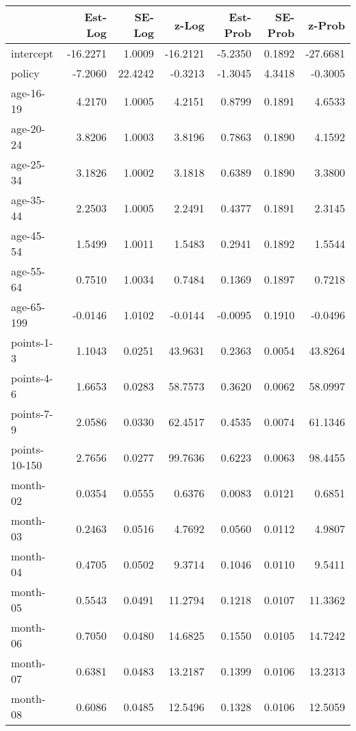 \documentclass[10pt]{article}
\begin{document}

\begin{table}[ht]
\centering
\begin{tabular}{lrrrrrr}
  \hline
 & Est-Log & SE-Log & z-Log & Est-Prob & SE-Prob & z-Prob \\ 
  \hline
intercept & -16.2271 & 1.0009 & -16.2121 & -5.2350 & 0.1892 & -27.6681 \\ 
  policy & -7.2060 & 22.4242 & -0.3213 & -1.3045 & 4.3418 & -0.3005 \\ 
  age-16-19 & 4.2170 & 1.0005 & 4.2151 & 0.8799 & 0.1891 & 4.6533 \\ 
  age-20-24 & 3.8206 & 1.0003 & 3.8196 & 0.7863 & 0.1890 & 4.1592 \\ 
  age-25-34 & 3.1826 & 1.0002 & 3.1818 & 0.6389 & 0.1890 & 3.3800 \\ 
  age-35-44 & 2.2503 & 1.0005 & 2.2491 & 0.4377 & 0.1891 & 2.3145 \\ 
  age-45-54 & 1.5499 & 1.0011 & 1.5483 & 0.2941 & 0.1892 & 1.5544 \\ 
  age-55-64 & 0.7510 & 1.0034 & 0.7484 & 0.1369 & 0.1897 & 0.7218 \\ 
  age-65-199 & -0.0146 & 1.0102 & -0.0144 & -0.0095 & 0.1910 & -0.0496 \\ 
  points-1-3 & 1.1043 & 0.0251 & 43.9631 & 0.2363 & 0.0054 & 43.8264 \\ 
  points-4-6 & 1.6653 & 0.0283 & 58.7573 & 0.3620 & 0.0062 & 58.0997 \\ 
  points-7-9 & 2.0586 & 0.0330 & 62.4517 & 0.4535 & 0.0074 & 61.1346 \\ 
  points-10-150 & 2.7656 & 0.0277 & 99.7636 & 0.6223 & 0.0063 & 98.4455 \\ 
  month-02 & 0.0354 & 0.0555 & 0.6376 & 0.0083 & 0.0121 & 0.6851 \\ 
  month-03 & 0.2463 & 0.0516 & 4.7692 & 0.0560 & 0.0112 & 4.9807 \\ 
  month-04 & 0.4705 & 0.0502 & 9.3714 & 0.1046 & 0.0110 & 9.5411 \\ 
  month-05 & 0.5543 & 0.0491 & 11.2794 & 0.1218 & 0.0107 & 11.3362 \\ 
  month-06 & 0.7050 & 0.0480 & 14.6825 & 0.1550 & 0.0105 & 14.7242 \\ 
  month-07 & 0.6381 & 0.0483 & 13.2187 & 0.1399 & 0.0106 & 13.2313 \\ 
  month-08 & 0.6086 & 0.0485 & 12.5496 & 0.1328 & 0.0106 & 12.5059 \\ 

\end{tabular}
\end{table}
\end{document}
